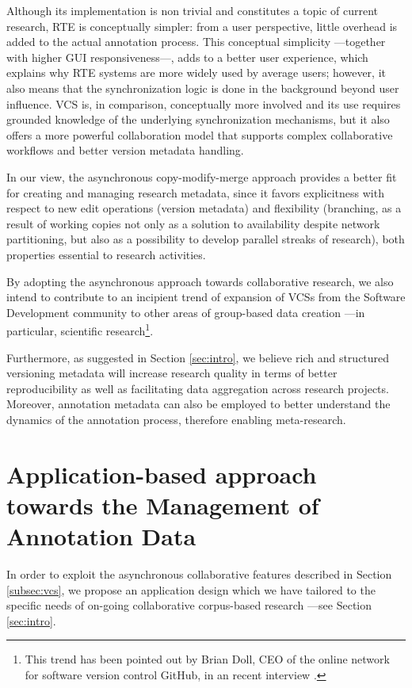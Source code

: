 \documentclass{sig-alternate}
\begin{document}
Although its implementation is non trivial and constitutes a topic of current research, RTE is
conceptually simpler: from a user perspective, little overhead is added to the actual annotation
process. This conceptual simplicity ---together with higher GUI responsiveness---, adds to
a better user experience, which explains why RTE systems are more widely used by average users;
however, it also means that the synchronization logic is done in the background beyond user
influence.
VCS is, in comparison, conceptually more involved and its use requires grounded knowledge of the
underlying synchronization mechanisms, but it also offers a more powerful collaboration model that
supports complex collaborative workflows and better version metadata handling.

In our view, the asynchronous copy-modify-merge approach provides a
better fit for creating and managing research metadata, since it favors explicitness with
respect to new edit operations (version metadata) and flexibility (branching, as a result of
working copies not only as a solution to availability despite network
partitioning, but also as a possibility to develop parallel streaks of research),
both properties essential to research activities.

By adopting the asynchronous approach towards collaborative research, we also intend to
contribute to an incipient trend of expansion of VCSs from the Software Development community
to other areas of group-based data creation ---in particular, scientific research\footnote{
  This trend has been pointed out by Brian Doll, CEO of the online network for software version
  control GitHub, in an recent interview \cite{Begel2013}.
}.

Furthermore, as suggested in Section \ref{sec:intro}, we believe rich and structured versioning
metadata will increase research quality in terms of better reproducibility as well as facilitating
data aggregation across research projects. Moreover, annotation metadata can also be employed
to better understand the dynamics of the annotation process, therefore enabling meta-research.

\section{Application-based approach towards the Management of Annotation Data}\label{sec:case}

In order to exploit the asynchronous collaborative features described in Section
\ref{subsec:vcs}, we propose an application design which we have tailored to the specific needs
of on-going collaborative corpus-based research ---see Section \ref{sec:intro}.
\end{document}

